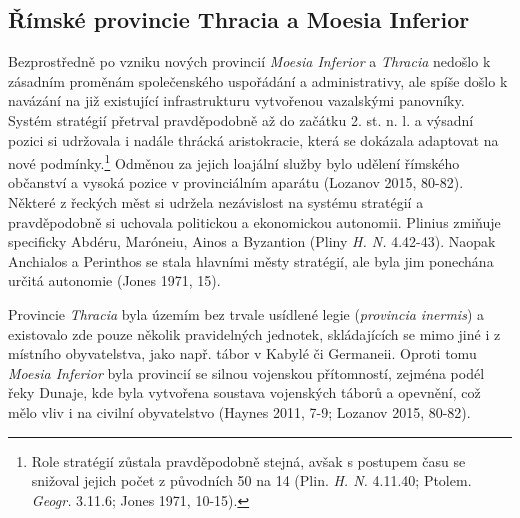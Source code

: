 
\subsection[římské-provincie-thracia-a-moesia-inferior]{Římské provincie Thracia a Moesia Inferior}

Bezprostředně po vzniku nových provincií {\em Moesia Inferior} a {\em Thracia} nedošlo k zásadním proměnám společenského uspořádání a administrativy, ale spíše došlo k navázání na již existující infrastrukturu vytvořenou vazalskými panovníky. Systém stratégií přetrval pravděpodobně až do začátku 2. st. n. l. a výsadní pozici si udržovala i nadále thrácká aristokracie, která se dokázala adaptovat na nové podmínky.\footnote{Role stratégií zůstala pravděpodobně stejná, avšak s postupem času se snižoval jejich počet z původních 50 na 14 (Plin. {\em H. N.} 4.11.40; Ptolem. {\em Geogr.} 3.11.6; Jones 1971, 10-15).} Odměnou za jejich loajální služby bylo udělení římského občanství a vysoká pozice v provinciálním aparátu (Lozanov 2015, 80-82). Některé z řeckých měst si udržela nezávislost na systému stratégií a pravděpodobně si uchovala politickou a ekonomickou autonomii. Plinius zmiňuje specificky Abdéru, Maróneiu, Ainos a Byzantion (Pliny {\em H. N.} 4.42-43). Naopak Anchialos a Perinthos se stala hlavními městy stratégií, ale byla jim ponechána určitá autonomie (Jones 1971, 15).

Provincie {\em Thracia} byla územím bez trvale usídlené legie ({\em provincia inermis}) a existovalo zde pouze několik pravidelných jednotek, skládajících se mimo jiné i z místního obyvatelstva, jako např. tábor v Kabylé či Germaneii. Oproti tomu {\em Moesia Inferior} byla provincií se silnou vojenskou přítomností, zejména podél řeky Dunaje, kde byla vytvořena soustava vojenských táborů a opevnění, což mělo vliv i na civilní obyvatelstvo (Haynes 2011, 7-9; Lozanov 2015, 80-82).


